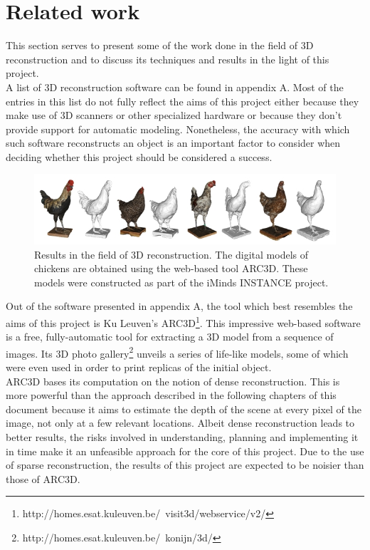 \documentclass[12pt,a4paper,twoside,openright]{report}
\begin{document}
\section{Related work}
This section serves to present some of the work done in the field of 3D reconstruction and to discuss its techniques and results in the light of this project.\\
\linebreak
A list of 3D reconstruction software can be found in appendix A. Most of the entries in this list do not fully reflect the aims of this project either because they make use of 3D scanners or other specialized hardware or because they don't provide support for automatic modeling. Nonetheless, the accuracy with which such software reconstructs an object is an important factor to consider when deciding whether this project should be considered a success.\\
\linebreak
\begin{figure}
\centerline{\includegraphics[scale=0.8]{figs/CHICKENS.jpg}}
\caption{Results in the field of 3D reconstruction. The digital models of chickens are obtained using the web-based tool ARC3D. These models were constructed as part of the iMinds INSTANCE project.}
\end{figure}
Out of the software presented in appendix A, the tool which best resembles the aims of this project is Ku Leuven's ARC3D\footnote{http://homes.esat.kuleuven.be/~visit3d/webservice/v2/}. This impressive web-based software is a free, fully-automatic tool for extracting a 3D model from a sequence of images. Its 3D photo gallery\footnote{http://homes.esat.kuleuven.be/~konijn/3d/} unveils a series of life-like models, some of which were even used in order to print replicas of the initial object.\\
\linebreak
ARC3D bases its computation on the notion of dense reconstruction\cite{tingdahl_lncs_11}. This is more powerful than the approach described in the following chapters of this document because it aims to estimate the depth of the scene at every pixel of the image, not only at a few relevant locations. Albeit dense reconstruction leads to better results, the risks involved in understanding, planning and implementing it in time make it an unfeasible approach for the core of this project. Due to the use of sparse reconstruction, the results of this project are expected to be noisier than those of ARC3D. 
\end{document}
